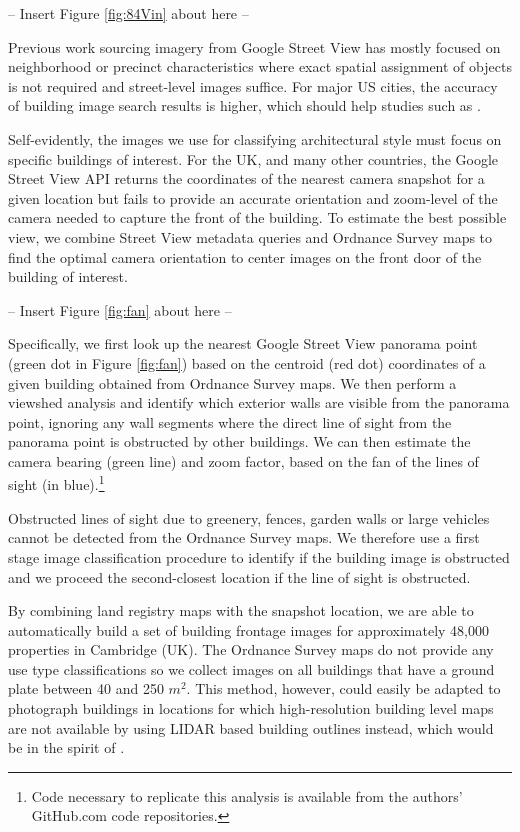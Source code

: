 \documentclass[]{article}
\begin{document}
\begin{center}
  -- Insert Figure \ref{fig:84Vin} about here --
\end{center}

Previous work sourcing imagery from Google Street View has mostly
focused on neighborhood or precinct characteristics where exact spatial
assignment of objects is not required and street-level images suffice.
For major US cities, the accuracy of building image search results is
higher, which should help studies such as
\textcite{GlaeserKincaidNaik2018}.

Self-evidently, the images we use for classifying architectural style
must focus on specific buildings of interest. For the UK, and many other
countries, the Google Street View API returns the coordinates of the
nearest camera snapshot for a given location but fails to provide an
accurate orientation and zoom-level of the camera needed to capture the
front of the building. To estimate the best possible view, we combine
Street View metadata queries and Ordnance Survey maps to find the
optimal camera orientation to center images on the front door of the
building of interest.

\begin{center}
  -- Insert Figure \ref{fig:fan} about here --
\end{center}

Specifically, we first look up the nearest Google Street View panorama
point (green dot in Figure \ref{fig:fan}) based on the centroid (red
dot) coordinates of a given building obtained from Ordnance Survey maps.
We then perform a viewshed analysis and identify which exterior walls
are visible from the panorama point, ignoring any wall segments where
the direct line of sight from the panorama point is obstructed by other
buildings. We can then estimate the camera bearing (green line) and zoom
factor, based on the fan of the lines of sight (in
blue).\footnote{Code necessary to replicate this analysis is available from the authors' GitHub.com code repositories.}

Obstructed lines of sight due to greenery, fences, garden walls or large
vehicles cannot be detected from the Ordnance Survey maps. We therefore
use a first stage image classification procedure to identify if the
building image is obstructed and we proceed the second-closest location
if the line of sight is obstructed.

By combining land registry maps with the snapshot location, we are able
to automatically build a set of building frontage images for
approximately 48,000 properties in Cambridge (UK). The Ordnance Survey
maps do not provide any use type classifications so we collect images on
all buildings that have a ground plate between 40 and 250 \(m^2\). This
method, however, could easily be adapted to photograph buildings in
locations for which high-resolution building level maps are not
available by using LIDAR based building outlines instead, which would be
in the spirit of \textcite{Glaeser2016}.
\end{document}
